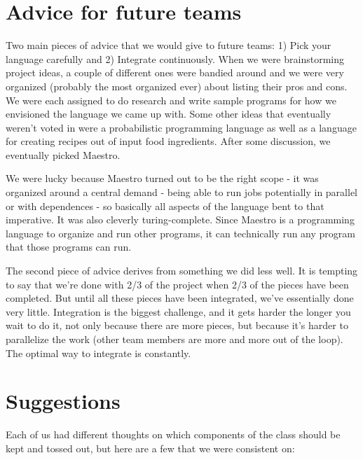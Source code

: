 \section{Advice for future teams}
Two main pieces of advice that we would give to future teams: 1) Pick your language carefully and 2) Integrate continuously. When we were brainstorming project ideas, a couple of different ones were bandied around and we were very organized (probably the most organized ever) about listing their pros and cons. We were each assigned to do research and write sample programs for how we envisioned the language we came up with. Some other ideas that eventually weren't voted in were a probabilistic programming language as well as a language for creating recipes out of input food ingredients. After some discussion, we eventually picked Maestro.

We were lucky because Maestro turned out to be the right scope - it was organized around a central demand - being able to run jobs potentially in parallel or with dependences - so basically all aspects of the language bent to that imperative. It was also cleverly turing-complete. Since Maestro is a programming language to organize and run other programs, it can technically run any program that those programs can run.

The second piece of advice derives from something we did less well. It is tempting to say that we're done with 2/3 of the project when 2/3 of the pieces have been completed. But until all these pieces have been integrated, we've essentially done very little. Integration is the biggest challenge, and it gets harder the longer you wait to do it, not only because there are more pieces, but because it's harder to parallelize the work (other team members are more and more out of the loop). The optimal way to integrate is constantly. 
    
\section{Suggestions}
Each of us had different thoughts on which components of the class should be kept and tossed out, but here are a few that we were consistent on:

